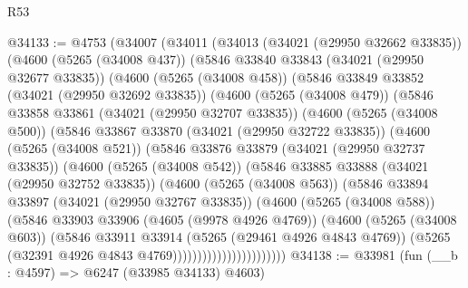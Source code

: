 \begin{lexlean}{R53}
\begin{coremodule}
@34133 := @4753
    (@34007
      (@34011
        (@34013
          (@34021 (@29950 @32662 @33835))
          (@4600
            (@5265 (@34008 @437))
            (@5846
              @33840
              @33843
              (@34021 (@29950 @32677 @33835))
              (@4600
                (@5265 (@34008 @458))
                (@5846
                  @33849
                  @33852
                  (@34021 (@29950 @32692 @33835))
                  (@4600
                    (@5265 (@34008 @479))
                    (@5846
                      @33858
                      @33861
                      (@34021 (@29950 @32707 @33835))
                      (@4600
                        (@5265 (@34008 @500))
                        (@5846
                          @33867
                          @33870
                          (@34021 (@29950 @32722 @33835))
                          (@4600
                            (@5265 (@34008 @521))
                            (@5846
                              @33876
                              @33879
                              (@34021 (@29950 @32737 @33835))
                              (@4600
                                (@5265 (@34008 @542))
                                (@5846
                                  @33885
                                  @33888
                                  (@34021 (@29950 @32752 @33835))
                                  (@4600
                                    (@5265 (@34008 @563))
                                    (@5846
                                      @33894
                                      @33897
                                      (@34021 (@29950 @32767 @33835))
                                      (@4600
                                        (@5265 (@34008 @588))
                                        (@5846
                                          @33903
                                          @33906
                                          (@4605 (@9978 @4926 @4769))
                                          (@4600
                                            (@5265 (@34008 @603))
                                            (@5846
                                              @33911
                                              @33914
                                              (@5265 (@29461 @4926 @4843 @4769))
                                              (@5265
                                                (@32391 @4926 @4843 @4769)))))))))))))))))))))))
@34138 := @33981 (fun (__b : @4597) => @6247 (@33985 @34133) @4603)

\end{coremodule}
\end{lexlean}
